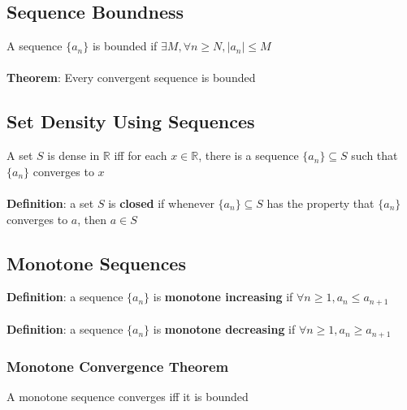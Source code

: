 \documentclass{article}
\begin{document}
  \subsection{Sequence Boundness}
  A sequence $\{a_n\}$ is bounded if $\exists M, \forall n \geq N, |a_n| \leq M$ \\ \\
  \textbf{Theorem}: Every convergent sequence is bounded
  \subsection{Set Density Using Sequences}
  A set $S$ is dense in $\mathbb{R}$ iff for each $x \in \mathbb{R}$, there is a sequence $\{a_n\} \subseteq S$ such that $\{a_n\}$ converges to $x$ \\ \\
  \textbf{Definition}: a set $S$ is \textbf{closed} if whenever $\{a_n\} \subseteq S$ has the property that $\{a_n\}$ converges to $a$, then $a \in S$
  \subsection{Monotone Sequences}
  \textbf{Definition}: a sequence $\{a_n\}$ is \textbf{monotone increasing} if $\forall n \geq 1, a_n \leq a_{n+1}$ \\ \\
  \textbf{Definition}: a sequence $\{a_n\}$ is \textbf{monotone decreasing} if $\forall n \geq 1, a_n \geq a_{n+1}$
  \subsubsection{Monotone Convergence Theorem}
  A monotone sequence converges iff it is bounded
\end{document}
